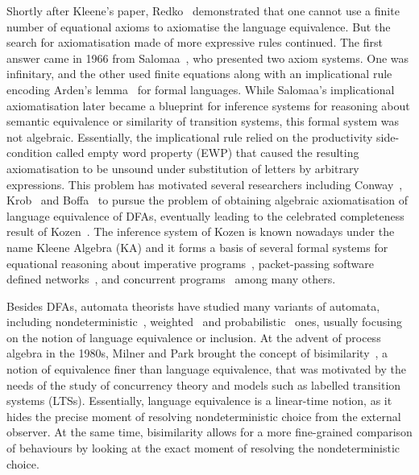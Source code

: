 Shortly after Kleene's paper, Redko~\cite{Redko:1964:Defining} demonstrated that one cannot use a finite number of equational axioms to axiomatise the language equivalence. But the search for axiomatisation made of more expressive rules continued. The first answer came in 1966 from Salomaa~\cite{Salomaa:1966:Two}, who presented two axiom systems. One was infinitary, and the other used finite equations along with an implicational rule encoding Arden's lemma~\cite{Arden:1961:Delayed} for formal languages. While Salomaa's implicational axiomatisation later became a blueprint for inference systems for reasoning about semantic equivalence or similarity of transition systems, this formal system was not algebraic. Essentially, the implicational rule relied on the productivity side-condition called empty word property (EWP) that caused the resulting axiomatisation to be unsound under substitution of letters by arbitrary expressions. This problem has motivated several researchers including Conway~\cite{Conway:2012:Regular}, Krob~\cite{Krob:1990:Complete} and Boffa~\cite{Boffa:1990:Une} to pursue the problem of obtaining algebraic axiomatisation of language equivalence of DFAs, eventually leading to the celebrated completeness result of Kozen~\cite{Kozen:1994:Completeness}. The inference system of Kozen is known nowadays under the name Kleene Algebra (KA) and it forms a basis of several formal systems for equational reasoning about imperative programs~\cite{Kozen:1996:Kleene}, packet-passing software defined networks~\cite{Anderson:2014:NetKAT}, and concurrent programs~\cite{Kappe:2017:Concurrent,Wagemaker:2019:Completeness} among many others.

Besides DFAs, automata theorists have studied many variants of automata, including nondeterministic~\cite{Rabin:1959:Finite}, weighted~\cite{Schutzenberger:1961:Definition} and probabilistic~\cite{Rabin:1963:Probabilistic} ones, usually focusing on the notion of language equivalence or inclusion. At the advent of process algebra in the 1980s, Milner and Park brought the concept of bisimilarity~\cite{Park:1981:Concurrency}, a notion of equivalence finer than language equivalence, that was motivated by the needs of the study of concurrency theory and models such as labelled transition systems (LTSs). Essentially, language equivalence is a linear-time notion, as it hides the precise moment of resolving nondeterministic choice from the external observer. At the same time, bisimilarity allows for a more fine-grained comparison of behaviours by looking at the exact moment of resolving the nondeterministic choice. 

